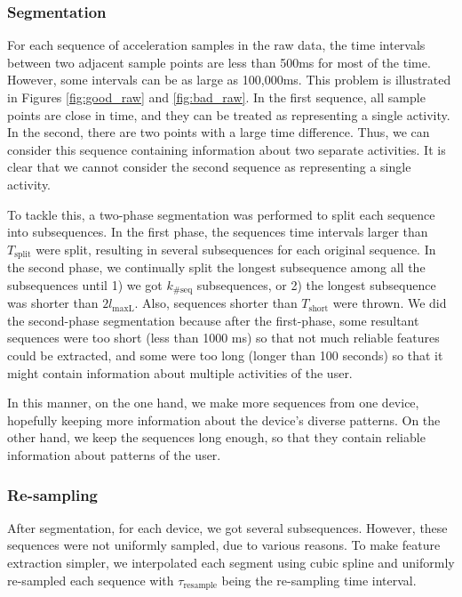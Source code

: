 \documentclass{article} %
\begin{document}
\subsubsection{Segmentation} %
For each sequence of acceleration samples in the raw data, the time intervals between two adjacent sample points are less than 500ms for most of the time. However, some intervals can be as large as 100,000ms. This problem is illustrated in Figures \ref{fig:good_raw} and \ref{fig:bad_raw}. In the first sequence, all sample points are close in time, and they can be treated as representing a single activity. In the second, there are two points with a large time difference. Thus, we can consider this sequence containing information about two separate activities. It is clear that we cannot consider the second sequence as representing a single activity. %

To tackle this, a two-phase segmentation was performed to split each sequence into subsequences. In the first phase, the sequences time intervals larger than $T_\mathrm{split}$ were split, resulting in several subsequences for each original sequence. In the second phase, we continually split the longest subsequence among all the subsequences until 1) we got $k_\mathrm{\#seq}$ subsequences, or 2) the longest subsequence was shorter than $2 l_\mathrm{maxL}$. Also, sequences shorter than $T_\mathrm{short}$ were thrown. We did the second-phase segmentation because after the first-phase, some resultant sequences were too short (less than 1000 ms) so that not much reliable features could be extracted, and some were too long (longer than 100 seconds) so that it might contain information about multiple activities of the user.

In this manner, on the one hand, we make more sequences from one device, hopefully keeping more information about the device's diverse patterns. On the other hand, we keep the sequences long enough, so that they contain reliable information about patterns of the user.

\subsubsection{Re-sampling} 
After segmentation, for each device, we got several subsequences. However, these sequences were not uniformly sampled, due to various reasons. To make feature extraction simpler, we interpolated each segment using cubic spline and uniformly re-sampled each sequence with  $\tau_\mathrm{resample}$ being the re-sampling time interval.
\end{document}
